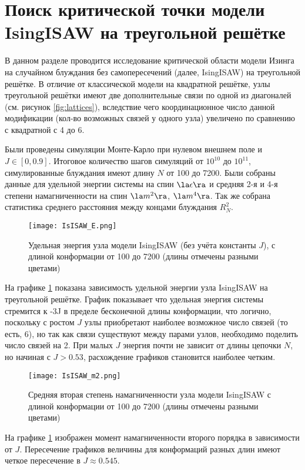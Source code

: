 \section{Поиск критической точки модели IsingISAW на треугольной решётке}

В данном разделе проводится исследование критической области модели Изинга на случайном блуждания без самопересечений (далее, IsingISAW) на треугольной решётке.
В отличие от классической модели на квадратной решётке, узлы треугольной решётки имеют две дополнительные связи по одной из диагоналей (см. рисунок \ref{fig:lattices}), 
вследствие чего координационное число данной модификации (кол-во возможных связей у одного узла) увеличено по сравнению с квадратной с 4 до 6.

Были проведены симуляции Монте-Карло при нулевом внешнем поле и $J \in [0,0.9]$. 
Итоговое количество шагов симуляций от $10^10$ до $10^11$, симулированные блуждания имеют длину $N$ от 100 до 7200.
Были собраны данные для удельной энергии системы на спин $\la \epsilon \ra$ и средняя 2-я и 4-я степени намагниченности на спин $\la m^2 \ra$, $\la m^4 \ra$.
Так же собрана статистика среднего расстояния между концами блуждания $R^2_N$.

\begin{figure}[h]
\centering
\texttt{[image: IsISAW\_E.png]}
\caption{Удельная энергия узла модели IsingISAW (без учёта константы $J$), с длиной конформации от 100 до 7200 (длины отмечены разными цветами)}
\label{fig:TrIsISAW_E}
\end{figure}

На графике \ref{fig:TrIsISAW_E} показана зависимость удельной энергии узла IsingISAW на треугольной решётке.
График показывает что удельная энергия системы стремится к -3J в пределе бесконечной длины конформации, 
что логично, поскольку с ростом $J$ узлы приобретают наиболее возможное число связей (то есть, 6), но так как связи существуют между парами узлов,
необходимо поделить число связей на 2.
При малых $J$ энергия почти не зависит от длины цепочки $N$, но начиная с $J > 0.53$, расхождение графиков становится наиболее четким.

\begin{figure}[h]
\centering
\texttt{[image: IsISAW\_m2.png]}
\caption{Средняя вторая степень намагниченности узла модели IsingISAW с длиной конформации от 100 до 7200 (длины отмечены разными цветами)}
\label{fig:TrIsISAW_m2}
\end{figure}

На графике \ref{fig:TrIsISAW_E} изображен момент намагниченности второго порядка в зависимости от $J$.
Пересечение графиков величины для конформаций разных длин имеют четкое пересечение в $J \approx 0.545$.

